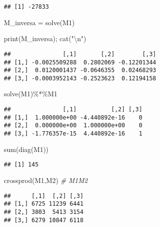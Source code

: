 \documentclass[
]{article}
\newenvironment{Shaded}{\begin{snugshade}}{\end{snugshade}}
\newcommand{\CommentTok}[1]{\textcolor[rgb]{0.56,0.35,0.01}{\textit{#1}}}
\newcommand{\FunctionTok}[1]{\textcolor[rgb]{0.00,0.00,0.00}{#1}}
\newcommand{\NormalTok}[1]{#1}
\newcommand{\OtherTok}[1]{\textcolor[rgb]{0.56,0.35,0.01}{#1}}
\newcommand{\SpecialCharTok}[1]{\textcolor[rgb]{0.00,0.00,0.00}{#1}}
\newcommand{\StringTok}[1]{\textcolor[rgb]{0.31,0.60,0.02}{#1}}
\begin{document}
\begin{verbatim}
## [1] -27833
\end{verbatim}

\begin{Shaded}
\begin{Highlighting}[]
\NormalTok{M\_inversa }\OtherTok{=} \FunctionTok{solve}\NormalTok{(M1)}

\FunctionTok{print}\NormalTok{(M\_inversa); }\FunctionTok{cat}\NormalTok{(}\StringTok{"}\SpecialCharTok{\textbackslash{}n}\StringTok{"}\NormalTok{)}
\end{Highlighting}
\end{Shaded}

\begin{verbatim}
##               [,1]       [,2]        [,3]
## [1,] -0.0025509288  0.2802069 -0.12201344
## [2,]  0.0120001437 -0.0646355  0.02468293
## [3,] -0.0003952143 -0.2523623  0.12194158
\end{verbatim}

\begin{Shaded}
\begin{Highlighting}[]
\FunctionTok{solve}\NormalTok{(M1)}\SpecialCharTok{\%*\%}\NormalTok{M1}
\end{Highlighting}
\end{Shaded}

\begin{verbatim}
##               [,1]          [,2] [,3]
## [1,]  1.000000e+00 -4.440892e-16    0
## [2,]  0.000000e+00  1.000000e+00    0
## [3,] -1.776357e-15  4.440892e-16    1
\end{verbatim}

\begin{Shaded}
\begin{Highlighting}[]
\FunctionTok{sum}\NormalTok{(}\FunctionTok{diag}\NormalTok{(M1))}
\end{Highlighting}
\end{Shaded}

\begin{verbatim}
## [1] 145
\end{verbatim}

\begin{Shaded}
\begin{Highlighting}[]
\FunctionTok{crossprod}\NormalTok{(M1,M2)   }\CommentTok{\# M1\textquotesingle{}M2}
\end{Highlighting}
\end{Shaded}

\begin{verbatim}
##      [,1]  [,2] [,3]
## [1,] 6725 11239 6441
## [2,] 3803  5413 3154
## [3,] 6279 10847 6118
\end{verbatim}
\end{document}

